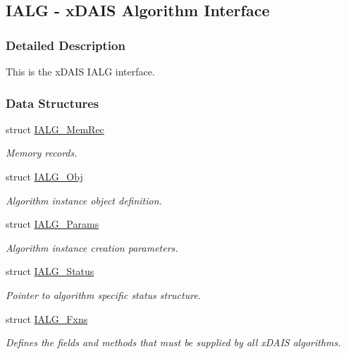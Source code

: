 \hypertarget{group__ti__xdais___i_a_l_g}{
\subsection{IALG - x\-DAIS Algorithm Interface}
\label{group__ti__xdais___i_a_l_g}
}


\subsubsection{Detailed Description}
This is the x\-DAIS IALG interface. 

\subsubsection*{Data Structures}
\begin{CompactItemize}
\item 
struct \hyperlink{struct_i_a_l_g___mem_rec}{IALG\_\-Mem\-Rec}
\begin{CompactList}\small\item\em Memory records. \item\end{CompactList}\item 
struct \hyperlink{struct_i_a_l_g___obj}{IALG\_\-Obj}
\begin{CompactList}\small\item\em Algorithm instance object definition. \item\end{CompactList}\item 
struct \hyperlink{struct_i_a_l_g___params}{IALG\_\-Params}
\begin{CompactList}\small\item\em Algorithm instance creation parameters. \item\end{CompactList}\item 
struct \hyperlink{struct_i_a_l_g___status}{IALG\_\-Status}
\begin{CompactList}\small\item\em Pointer to algorithm specific status structure. \item\end{CompactList}\item 
struct \hyperlink{struct_i_a_l_g___fxns}{IALG\_\-Fxns}
\begin{CompactList}\small\item\em Defines the fields and methods that must be supplied by all x\-DAIS algorithms. \item\end{CompactList}\end{CompactItemize}
